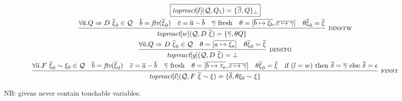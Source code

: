 \documentclass{article}
\newcommand{\multi}[1]{{\overline{#1}}}
\newcommand{\Q}{\mathcal{Q}}
\newcommand{\To}{\Rightarrow}
\newcommand{\rulen}[1]{\textsc{#1}}
\begin{document}
\[
\begin{array}{c}
\framebox{$\topreact{l}{\Q, Q_1} = \{ \multi{\beta}, Q \}_\bot$} \\
\\[-3mm]

\infer[\rulen{dinstw}]
  {\topreact{w}{\Q, D ~ \multi{\xi}} = \{ \multi{\gamma}, \theta Q \}}
  {\forall \multi{a}. Q \To D ~ \multi{\xi}_0 \in \Q &
   \multi{b} = \textit{ftv}(\multi{\xi}_0) &
   \multi{c} = \multi{a} - \multi{b} &
   \multi{\gamma} ~ \text{fresh} &
   \theta = [\multi{b \mapsto \xi_b}, \multi{c \mapsto \gamma}] &
   \theta \multi{\xi}_0 = \multi{\xi}}
\\[1mm]
\infer[\rulen{dinstg}]
  {\topreact{g}{\Q, D ~ \multi{\xi}} = \bot}
  {\forall \multi{a}. Q \To D ~ \multi{\xi}_0 \in \Q &
   \theta = [\multi{a \mapsto \xi_a}] &
   \theta \multi{\xi}_0 = \multi{\xi}}
\\[1mm]
\infer[\rulen{finst}]
  {\topreact{l}{\Q, F ~ \multi{\xi} \sim \xi} = \{ \multi{\delta}, \theta \xi_0 \sim \xi \}}
  {\forall \multi{a}. F ~ \multi{\xi}_0 \sim \xi_0 \in \Q &
   \multi{b} = \textit{ftv}(\multi{\xi}_0) &
   \multi{c} = \multi{a} - \multi{b} &
   \multi{\gamma} ~ \text{fresh} &
   \theta = [\multi{b \mapsto \tau_a}, \multi{c \mapsto \gamma}] &
   \theta \multi{\xi}_0 = \multi{\xi} &
   \text{if} ~ (l = w) ~ \text{then} ~ \multi{\delta} = \multi{\gamma} ~ \text{else} ~ \multi{\delta} = \epsilon}
\end{array}
\]

NB: givens never contain touchable variables.
\end{document}
